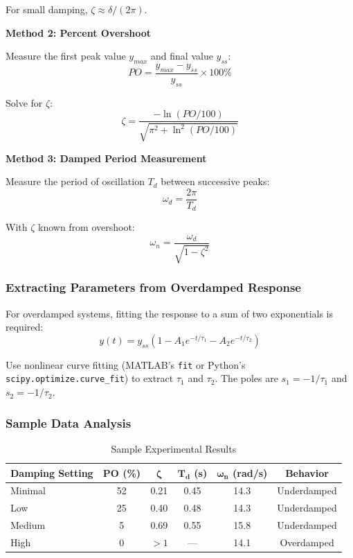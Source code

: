 For small damping, $\zeta \approx \delta/(2\pi)$.

\textbf{Method 2: Percent Overshoot}

Measure the first peak value $y_{max}$ and final value $y_{ss}$:
\begin{equation}
PO = \frac{y_{max} - y_{ss}}{y_{ss}} \times 100\%
\end{equation}

Solve for $\zeta$:
\begin{equation}
\zeta = \frac{-\ln(PO/100)}{\sqrt{\pi^2 + \ln^2(PO/100)}}
\end{equation}

\textbf{Method 3: Damped Period Measurement}

Measure the period of oscillation $T_d$ between successive peaks:
\begin{equation}
\omega_d = \frac{2\pi}{T_d}
\end{equation}

With $\zeta$ known from overshoot:
\begin{equation}
\omega_n = \frac{\omega_d}{\sqrt{1-\zeta^2}}
\end{equation}

\subsubsection{Extracting Parameters from Overdamped Response}

For overdamped systems, fitting the response to a sum of two exponentials is required:
\begin{equation}
y(t) = y_{ss}\left(1 - A_1 e^{-t/\tau_1} - A_2 e^{-t/\tau_2}\right)
\end{equation}

Use nonlinear curve fitting (MATLAB's \texttt{fit} or Python's \texttt{scipy.optimize.curve\_fit}) to extract $\tau_1$ and $\tau_2$. The poles are $s_1 = -1/\tau_1$ and $s_2 = -1/\tau_2$.

\subsubsection{Sample Data Analysis}

\begin{table}[H]
\centering
\caption{Sample Experimental Results}
\label{tab:sample_results}
\begin{tabular}{lccccc}
\toprule
\textbf{Damping Setting} & \textbf{PO (\%)} & $\boldsymbol{\zeta}$ & $\boldsymbol{T_d}$ (s) & $\boldsymbol{\omega_n}$ (rad/s) & \textbf{Behavior} \\
\midrule
Minimal & 52 & 0.21 & 0.45 & 14.3 & Underdamped \\
Low & 25 & 0.40 & 0.48 & 14.3 & Underdamped \\
Medium & 5 & 0.69 & 0.55 & 15.8 & Underdamped \\
High & 0 & $>1$ & --- & 14.1 & Overdamped \\
\bottomrule
\end{tabular}
\end{table}

